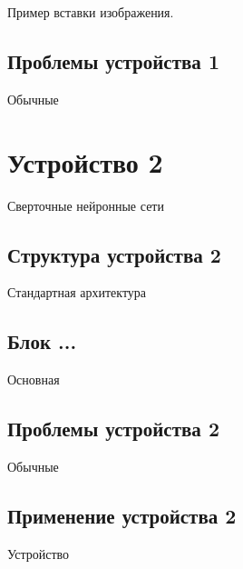 Пример вставки изображения.              

\subsection{Проблемы устройства 1}
\hspace*{12.5 mm}Обычные 

\section{Устройство 2}
\hspace*{12.5 mm}
Сверточные нейронные сети

\subsection{Структура устройства 2}
\hspace*{12.5 mm}Стандартная архитектура 

\subsection{Блок ...}
\hspace*{12.5 mm}Основная 

\subsection{Проблемы устройства 2}
\hspace*{12.5 mm}Обычные 

\subsection{Применение устройства 2}
\hspace*{12.5 mm}Устройство

